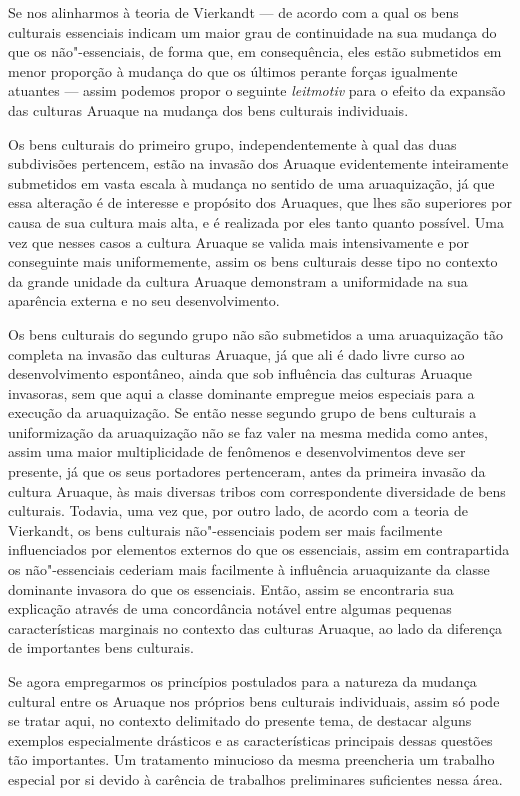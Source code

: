 Se nos alinharmos à teoria de Vierkandt --- de acordo com a qual os bens
culturais essenciais indicam um maior grau de continuidade na sua
mudança do que os não"-essenciais, de forma que, em consequência, eles
estão submetidos em menor proporção à mudança do que os últimos perante
forças igualmente atuantes --- assim podemos propor o seguinte
\emph{leitmotiv} para o efeito da expansão das culturas Aruaque na
mudança dos bens culturais individuais.

Os bens culturais do primeiro grupo, independentemente à qual das duas
subdivisões pertencem, estão na invasão dos Aruaque evidentemente
inteiramente submetidos em vasta escala à mudança no sentido de uma
aruaquização, já que essa alteração é de interesse e propósito dos
Aruaques, que lhes são superiores por causa de sua cultura mais alta, e
é realizada por eles tanto quanto possível. Uma vez que nesses casos a
cultura Aruaque se valida mais intensivamente e por conseguinte mais
uniformemente, assim os bens culturais desse tipo no contexto da grande
unidade da cultura Aruaque demonstram a uniformidade na sua aparência
externa e no seu desenvolvimento.

Os bens culturais do segundo grupo não são submetidos a uma aruaquização
tão completa na invasão das culturas Aruaque, já que ali é dado livre
curso ao desenvolvimento espontâneo, ainda que sob influência das
culturas Aruaque invasoras, sem que aqui a classe dominante empregue
meios especiais para a execução da aruaquização. Se então nesse segundo
grupo de bens culturais a uniformização da aruaquização não se faz
valer na mesma medida como antes, assim uma maior multiplicidade de
fenômenos e desenvolvimentos deve ser presente, já que os seus
portadores pertenceram, antes da primeira invasão da cultura Aruaque, às
mais diversas tribos com correspondente diversidade de bens culturais.
Todavia, uma vez que, por outro lado, de acordo com a teoria de
Vierkandt, os bens culturais não"-essenciais podem ser mais facilmente
influenciados por elementos externos do que os essenciais, assim em
contrapartida os não"-essenciais cederiam mais facilmente à influência
aruaquizante da classe dominante invasora do que os essenciais. Então,
assim se encontraria sua explicação através de uma concordância notável
entre algumas pequenas características marginais no contexto das
culturas Aruaque, ao lado da diferença de importantes bens culturais.

Se agora empregarmos os princípios postulados para a natureza da
mudança cultural entre os Aruaque nos próprios bens culturais
individuais, assim só pode se tratar aqui, no contexto delimitado do
presente tema, de destacar alguns exemplos especialmente drásticos e as
características principais dessas questões tão importantes. Um
tratamento minucioso da mesma preencheria um trabalho especial por si
devido à carência de trabalhos preliminares suficientes nessa área.

